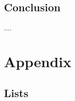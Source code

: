 \documentclass  [
  paper    = a4,
  BCOR     = 10mm,
  twoside,
  fontsize = 12pt,
  fleqn,
  toc      = bibnumbered,
  toc      = listofnumbered,
  numbers  = noendperiod,
  headings = normal,
  listof   = leveldown,
  version  = 3.03
]                                       {scrreprt}
\begin{document}
	\chapter{Conclusion}
	....
	
	
	



  \part{Appendix}
  \begin{appendix}
    \chapter{Lists}
    \listoffigures
    \listoftables
    {}
    
    
  \end{appendix}
\end{document}
